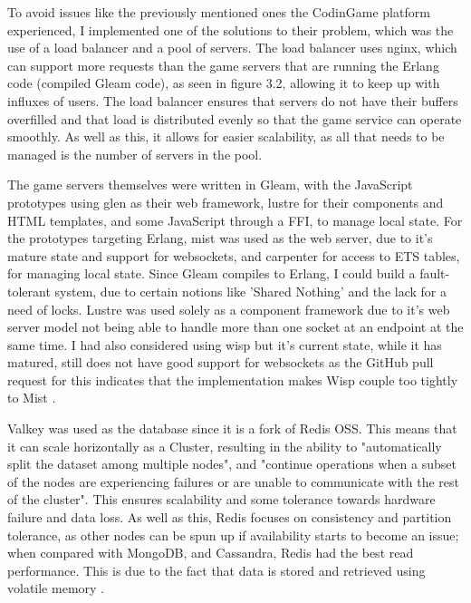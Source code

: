 \documentclass[]{final}
\begin{document}
To avoid issues like the previously mentioned ones the CodinGame platform
experienced, I implemented one of the
solutions to their problem, which was the use of a load balancer and a pool
of servers\cite{jobert_story_2017}. The load balancer uses nginx, which can
support more requests
than the game servers that are running the Erlang code (compiled Gleam code),
as seen in figure 3.2, allowing it to keep up with influxes of users.
The load balancer ensures that servers do not have their buffers overfilled
and that load is distributed evenly so that the game service can operate smoothly.
As well as this, it allows for easier scalability, as all that needs to be managed is the
number of servers in the pool.


The game servers themselves were written in Gleam, with the JavaScript prototypes
using glen as their web framework, lustre for their components and HTML templates,
and some JavaScript through a FFI, to manage local state. For the prototypes
targeting Erlang, mist was used as the web server, due to it's mature state
and support for websockets, and carpenter for access to ETS tables, for managing
local state. Since Gleam compiles to Erlang, I could build a fault-tolerant
system, due to certain notions like 'Shared Nothing' and the lack for a need
of locks. Lustre was used solely as a component framework due to it's web server model
not being able to handle more than one socket at an endpoint at the same time.
I had also considered using wisp but it's current state, while it has matured, still
does not have good support for websockets as the GitHub pull request for this indicates
that the implementation makes Wisp couple too tightly to Mist \cite{noauthor_websockets_nodate}.

Valkey was used as the database since it is a fork of Redis OSS.
This means that it can scale horizontally as a Cluster, resulting in
the ability to "automatically split the dataset among multiple nodes", and
"continue operations when a subset of the nodes are experiencing failures
or are unable to communicate with the rest of the cluster"\cite{noauthor_scale_nodate}.
This ensures scalability and some tolerance towards hardware failure and data loss.
As well as this, Redis focuses on consistency and partition tolerance, as other nodes
can be spun up if availability starts to become an issue; when compared with
MongoDB, and Cassandra, Redis had the best read performance. This is due to the fact that data is stored and retrieved using
volatile memory \cite{department_of_information_systems_university_of_nizwa_sultanate_of_oman_study_2022}.
\end{document}
